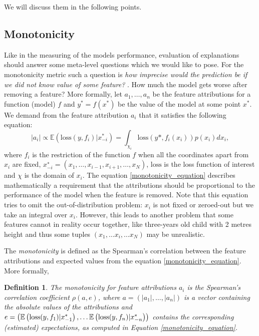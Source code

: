 \documentclass[magisterska,en]{pracamgr}
\newtheorem{defi}{Definition}[section]
\begin{document}
We will discuss them in the following points.


\subsection{Monotonicity}
Like in the measuring of the models performance, evaluation of explanations should answer some meta-level questions which we would like to pose. For the monotonicity metric such a question is \textit{how imprecise would the prediction be if we did not know value of some feature?} \cite{DBLP:journals/corr/abs-2007-07584}. How much the model gets worse after removing a feature? More formally, let $a_1, \ldots, a_n$ be the feature attributions for a function (model) $f$ and $y^* = f(x^*)$ be the value of the model at some point $x^*$. We demand from the feature attribution $a_i$ that it satisfies the following equation:
\begin{equation} \label{monotonicity_equation}
    |a_i| \propto  \mathbb{E}\left(\textrm{loss}(y, f_i) | x_{-i}^*\right)  =  \int _{\chi _i} \textrm{loss} \left(y*, f_i(x_i)\right)p(x_i)dx_i ,
\end{equation}
where $f_i$ is the restriction of the function $f$ when all the coordinates apart from $x_i$ are fixed, $x^{∗}_{-i} = (x_1, \ldots, x_{i−1}, x_{i+1}, \ldots, x_N)$,
$\textrm{loss}$ is the loss function of interest and $\chi$ is the domain of $x_i$. The equation \ref{monotonicity_equation} describes mathematically a requirement that the attributions should be proportional to the performance of the model when the feature is removed. Note that this equation tries to omit the out-of-distribution problem: $x_i$ is not fixed or zeroed-out but we take an integral over $x_i$. However, this leads to another problem that some features cannot in reality occur together, like three-years old child with 2 metres height and thus some tuples $(x_1, \ldots x_i, \ldots x_N)$ may be unrealistic.


The \textit{monotonicity} is defined as the Spearman's correlation between the feature attributions and expected values from the equation \ref{monotonicity_equation}. More formally,

\begin{defi}
    The monotonicity for feature attributions $a_i$ is the Spearman’s correlation coefficient $\rho (a, e)$, where $a= \left(|a_1|, \ldots, |a_n|\right)$ is a vector containing the absolute values of the attributions and
    $e = \left(\mathbb{E}\left(\textup{loss}(y, f_1) | x_{-1}^*\right), \ldots \mathbb{E}\left(\textup{loss}(y, f_n) | x_{-n}^* \right) \right)$
contains the corresponding (estimated)
expectations, as computed in Equation \ref{monotonicity_equation}.
\end{defi}
\end{document}
